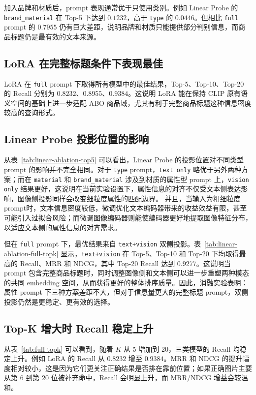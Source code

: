\documentclass[11pt, a4paper]{ctexart}
\begin{document}
加入品牌和材质后，prompt 表现通常优于只使用类别。例如 Linear Probe 的 \texttt{brand\_material} 在 Top-5 下达到 $0.1232$，高于 \texttt{type} 的 $0.0446$。但相比 \texttt{full} prompt 的 $0.7955$ 仍有巨大差距，说明品牌和材质只能提供部分判别信息，而商品标题仍是最有效的文本来源。

\subsection{LoRA 在完整标题条件下表现最佳}

LoRA 在 \texttt{full} prompt 下取得所有模型中的最佳结果，Top-5、Top-10、Top-20 的 Recall 分别为 $0.8232$、$0.8955$、$0.9384$。这说明 LoRA 能在保持 CLIP 原有语义空间的基础上进一步适配 ABO 商品域，尤其有利于完整商品标题这种信息密度较高的查询形式。

\subsection{Linear Probe 投影位置的影响}

从表~\ref{tab:linear-ablation-top5} 可以看出，Linear Probe 的投影位置对不同类型 prompt 的影响并不完全相同。对于 \texttt{type} prompt，\texttt{text only} 略优于另外两种方案；而在 \texttt{material} 和 \texttt{brand\_material} 涉及到材质的属性型 prompt 上，\texttt{vision only} 结果更好，这说明在当前实验设置下，属性信息的对齐不仅受文本侧表达影响，图像侧投影同样会改变细粒度属性的匹配边界。
并且，当输入为粗细粒度prompt时，文本信息密度较低，微调优化文本编码器带来的收益效益有限，甚至可能引入过拟合风险；而微调图像编码器则能使编码器更好地提取图像特征分布，以适应文本侧的属性信息的对齐需求。

但在 \texttt{full} prompt 下，最优结果来自 \texttt{text+vision} 双侧投影。表~\ref{tab:linear-ablation-full-topk} 显示，\texttt{text+vision} 在 Top-5、Top-10 和 Top-20 下均取得最高的 Recall、MRR 和 NDCG，其中 Top-20 Recall 达到 $0.9277$。这说明当 prompt 包含完整商品标题时，同时调整图像侧和文本侧可以进一步重塑两种模态的共同 embedding 空间，从而获得更好的整体排序质量。因此，消融实验表明：属性 prompt 下三种方案差距不大，但对于信息量更大的完整标题 prompt，双侧投影仍然是更稳定、更有效的选择。

\subsection{Top-K 增大时 Recall 稳定上升}

从表~\ref{tab:full-topk} 可以看到，随着 $K$ 从 5 增加到 20，三类模型的 Recall 均稳定上升。例如 LoRA 的 Recall 从 $0.8232$ 增至 $0.9384$。MRR 和 NDCG 的提升幅度相对较小，这是因为它们更关注正确结果是否排在靠前位置；如果正确图片主要从第 6 到第 20 位被补充命中，Recall 会明显上升，而 MRR/NDCG 增益会较温和。
\end{document}
